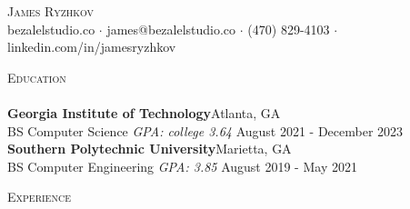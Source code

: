\documentclass[a4paper]{article}
\newcommand{\lineunder} {
    \vspace*{-8pt} \\
    \hspace*{-18pt} \hrulefill \\
}
\newcommand{\header} [1] {
    {\hspace*{-18pt}\vspace*{6pt} \textsc{#1}}
    \vspace*{-6pt} \lineunder
}
\begin{document}
\vspace*{-40pt}

    

\vspace*{-10pt}
\begin{center}
	{\Huge \scshape {James Ryzhkov}}\\
	bezalelstudio.co $\cdot$ james@bezalelstudio.co $\cdot$ (470) 829-4103 $\cdot$ linkedin.com/in/jamesryzhkov\\
\end{center}

\header{Education}
\textbf{Georgia Institute of Technology}\hfill Atlanta, GA\\
BS Computer Science \textit{GPA: college 3.64} \hfill August 2021 - December 2023\\
\vspace{2mm}
\textbf{Southern Polytechnic University}\hfill Marietta, GA\\
BS Computer Engineering \textit{GPA: 3.85} \hfill August 2019 - May 2021\\
\vspace{2mm}

\header{Experience}
\vspace{1mm}
\end{document}
